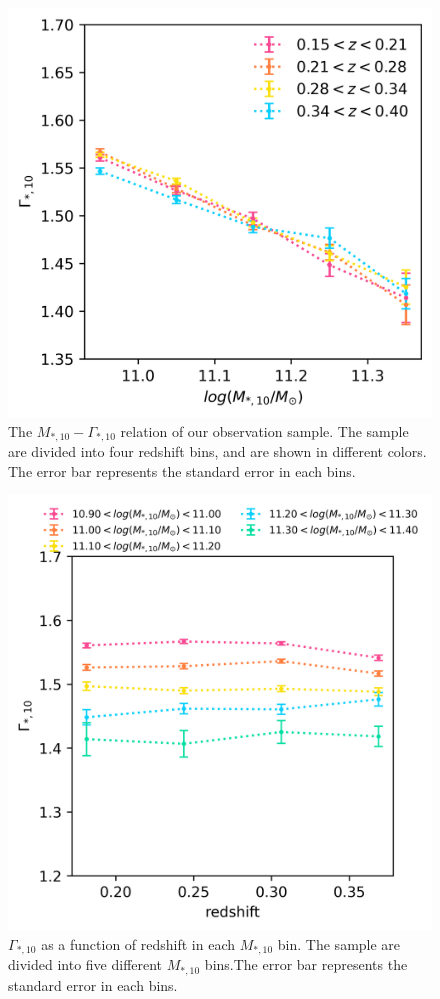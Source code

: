 \documentclass[fleqn,usenatbib]{mnras}
\begin{document}
\begin{figure}
    \centering
    \includegraphics[width=\linewidth]{figure/mg_relation.png}
    \caption{The $M_{*,10} - \Gamma_{*,10}$ relation of our observation sample. The sample are divided into four redshift bins, and are shown in different colors. The error bar represents the standard error in each bins.}
    \label{fig:mg_relation}
\end{figure}
\begin{figure}
    \centering
    \includegraphics[width=\linewidth]{figure/gamma.png}
    \caption{$\Gamma_{*,10}$ as a function of redshift in each $M_{*,10} $ bin. The sample are divided into five different $M_{*,10}$ bins.The error bar represents the standard error in each bins.}
    \label{fig:gamma}
\end{figure}
\end{document}
